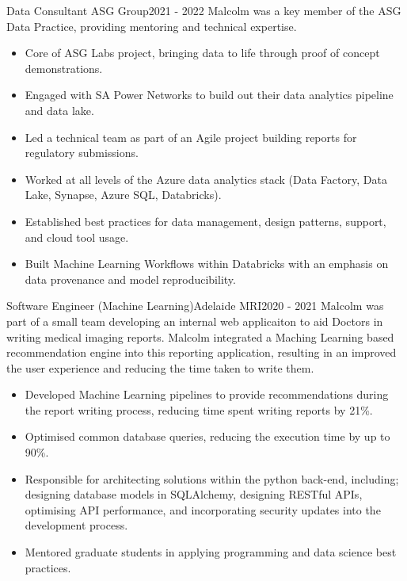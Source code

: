 \begin{cventry}{Data Consultant} {ASG Group}{}{2021 - 2022}
  Malcolm was a key member of the ASG Data Practice,
  providing mentoring and technical expertise.

  \begin{itemize}
    \item Core of ASG Labs project, bringing data to life through proof of concept demonstrations.
    \item Engaged with SA Power Networks to build out their data analytics pipeline and data lake.
    \item Led a technical team as part of an Agile project building reports for regulatory submissions.
    \item Worked at all levels of the Azure data analytics stack (Data Factory, Data Lake, Synapse, Azure SQL, Databricks).
    \item Established best practices for data management, design patterns, support, and cloud tool usage.
    \item Built Machine Learning Workflows within Databricks with an emphasis on data provenance and model reproducibility.
  \end{itemize}

\end{cventry}

\begin{cventry}{Software Engineer (Machine Learning)}{Adelaide MRI}{}{2020 - 2021}
  Malcolm was part of a small team developing an internal web applicaiton
  to aid Doctors in writing medical imaging reports.
  Malcolm integrated a Maching Learning based recommendation engine
  into this reporting application,
  resulting in an improved the user experience and
  reducing the time taken to write them. 
  \begin{itemize}
    \item Developed Machine Learning pipelines to provide recommendations
      during the report writing process, reducing time spent
      writing reports by 21\%.
    \item Optimised common database queries, reducing the execution time by
      up to 90\%.
    \item Responsible for architecting solutions
      within the python back-end, including;
      designing database models in SQLAlchemy,
      designing RESTful APIs,
      optimising API performance,
      and incorporating security updates into the development process.
    \item Mentored graduate students in applying programming and data science
      best practices.
  \end{itemize}
\end{cventry}

